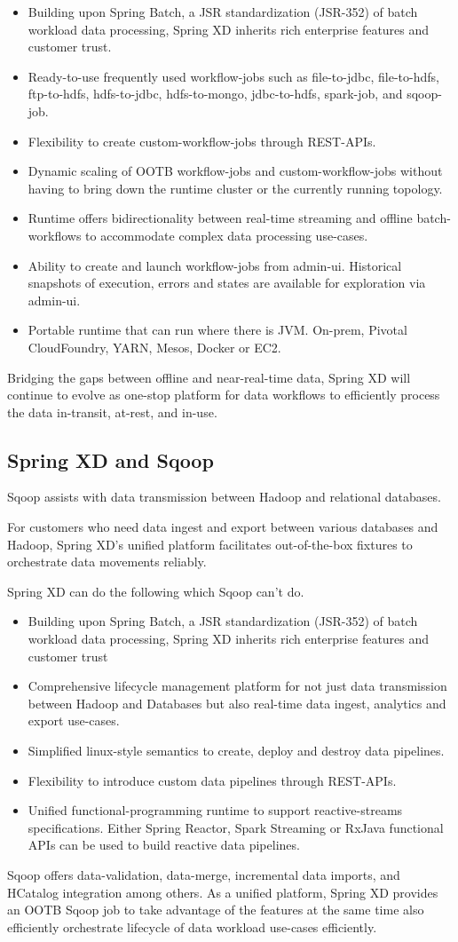 \begin{itemize}
\item Building upon Spring Batch, a JSR standardization (JSR-352) of batch workload data processing, Spring XD inherits rich enterprise features and customer trust.
\item Ready-to-use frequently used workflow-jobs such as file-to-jdbc, file-to-hdfs, ftp-to-hdfs, hdfs-to-jdbc, hdfs-to-mongo, jdbc-to-hdfs, spark-job, and sqoop-job.
\item Flexibility to create custom-workflow-jobs through REST-APIs.
\item Dynamic scaling of OOTB workflow-jobs and custom-workflow-jobs without having to bring down the runtime cluster or the currently running topology.
\item Runtime offers bidirectionality between real-time streaming and offline batch-workflows to accommodate complex data processing use-cases.
\item Ability to create and launch workflow-jobs from admin-ui. Historical snapshots of execution, errors and states are available for exploration via admin-ui.
\item Portable runtime that can run where there is JVM. On-prem, Pivotal CloudFoundry, YARN, Mesos, Docker or EC2.
\end{itemize}

Bridging the gaps between offline and near-real-time data, Spring XD will continue to evolve as one-stop platform for data workflows to efficiently process the data in-transit, at-rest, and in-use.

\subsection{Spring XD and Sqoop}
Sqoop assists with data transmission between Hadoop and relational databases.

For customers who need data ingest and export between various databases and Hadoop, Spring XD's unified platform facilitates out-of-the-box fixtures to orchestrate data movements reliably. 

Spring XD can do the following which Sqoop can't do.

\begin{itemize}
\item Building upon Spring Batch, a JSR standardization (JSR-352) of batch workload data processing, Spring XD inherits rich enterprise features and customer trust
\item Comprehensive lifecycle management platform for not just data transmission between Hadoop and Databases but also real-time data ingest, analytics and export use-cases.
\item Simplified linux-style semantics to create, deploy and destroy data pipelines.
\item Flexibility to introduce custom data pipelines through REST-APIs.
\item Unified functional-programming runtime to support reactive-streams specifications. Either Spring Reactor, Spark Streaming or RxJava functional APIs can be used to build reactive data pipelines.
\end{itemize}

Sqoop offers data-validation, data-merge, incremental data imports, and HCatalog integration among others. As a unified platform, Spring XD provides an OOTB Sqoop job to take advantage of the features at the same time also efficiently orchestrate lifecycle of data workload use-cases efficiently.
